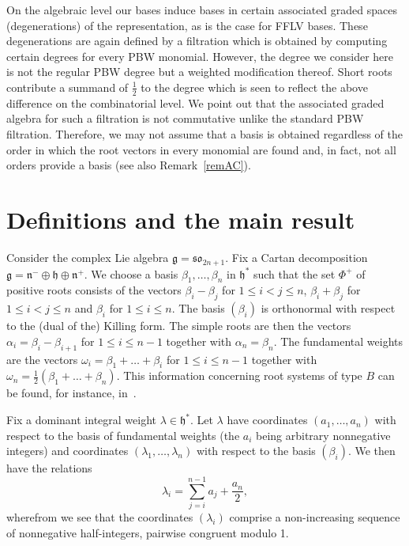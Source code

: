 \documentclass[ALCO,ThmDefs,Unicode]{cedram}
\newcommand{\la}{\lambda}
\begin{document}
On the algebraic level our bases induce bases in certain associated graded spaces (degenerations) of the representation, as is the case for FFLV bases. These degenerations are again defined by a filtration which is obtained by computing certain degrees for every PBW monomial. However, the degree we consider here is not the regular PBW degree but a weighted modification thereof. Short roots contribute a summand of $\frac12$ to the degree which is seen to reflect the above difference on the combinatorial level. We point out that the associated graded algebra for such a filtration is not commutative unlike the standard PBW filtration. Therefore, we may not assume that a basis is obtained regardless of the order in which the root vectors in every monomial are found and, in fact, not all orders provide a basis (see also Remark~\ref{remAC}).


\section{Definitions and the main result}\label{defsec}

Consider the complex Lie algebra $\mathfrak{g}=\mathfrak{so}_{2n+1}$. Fix a Cartan decomposition $\mathfrak g=\mathfrak n^-\oplus\mathfrak h\oplus\mathfrak n^+$. We choose a basis $\beta_1,\dots,\beta_n$ in $\mathfrak h^*$ such that the set $\Phi^+$ of positive roots consists of the vectors $\beta_i-\beta_j$ for $1\le i<j\le n$, $\beta_i+\beta_j$ for $1\le i<j\le n$ and $\beta_i$ for $1\le i\le n$. The basis $(\beta_i)$ is orthonormal with respect to the (dual of the) Killing form. The simple roots are then the vectors $\alpha_i=\beta_i-\beta_{i+1}$ for $1\le i\le n-1$ together with $\alpha_n=\beta_n$. The fundamental weights are the vectors $\omega_i=\beta_1+\dots+\beta_i$ for $1\le i\le n-1$ together with $\omega_n=\frac12(\beta_1+\dots+\beta_n)$. This information concerning root systems of type $B$ can be found, for instance, in~\cite{carter}.

Fix a dominant integral weight $\lambda\in\mathfrak h^*$. Let $\lambda$ have coordinates $(a_1,\dots,a_n)$ with respect to the basis of fundamental weights (the $a_i$ being arbitrary nonnegative integers) and coordinates $(\la_1,\dots,\la_n)$ with respect to the basis $(\beta_i)$. We then have the relations
\[
\lambda_i=\sum_{j=i}^{n-1}a_j+\frac{a_n}2,
\]
wherefrom we see that the coordinates $(\la_i)$ comprise a non-increasing sequence of nonnegative half-integers, pairwise congruent modulo 1.
\end{document}
